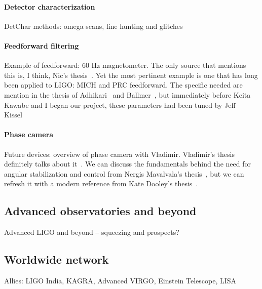                 \paragraph{Detector characterization}
                \label{detchar}
            
                    DetChar methods: omega scans, line hunting and glitches

                \paragraph{Feedforward filtering}
                \label{feedforward_filters}

                    Example of feedforward: 60 Hz magnetometer. The only source that mentions this is, I think, Nic's thesis~\cite{SmithThesis}. Yet the most pertinent example is one that has long been applied to LIGO: MICH and PRC feedforward. The specific needed are mention in the thesis of Adhikari~\cite{AdhikariThesis} and Ballmer~\cite{BallmerThesis}, but immediately before Keita Kawabe and I began our project, these parameters had been tuned by Jeff Kissel~\cite{KissellPRCMICH}

                \paragraph{Phase camera}
                \label{phase_camera}

                    Future devices: overview of phase camera with Vladimir. Vladimir's thesis definitely talks about it~\cite{DergachevThesis}. We can discuss the fundamentals behind the need for angular stabilization and control from Nergis Mavalvala's thesis~\cite{MavalvalaThesis}, but we can refresh it with a modern reference from Kate Dooley's thesis~\cite{DooleyThesis}.


        \subsection{Advanced observatories and beyond}
        \label{advanced}
  
            Advanced LIGO and beyond -- squeezing and prospects?

        \subsection{Worldwide network}
        \label{worldwide}
 
            Allies: LIGO India, KAGRA, Advanced VIRGO, Einstein Telescope, LISA

